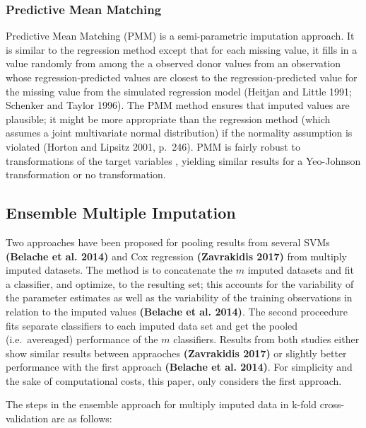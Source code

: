 \documentclass[12pt,]{article}
\begin{document}
\subsubsection{Predictive Mean Matching}\label{predictive-mean-matching}

Predictive Mean Matching (PMM) is a semi-parametric imputation approach.
It is similar to the regression method except that for each missing
value, it fills in a value randomly from among the a observed donor
values from an observation whose regression-predicted values are closest
to the regression-predicted value for the missing value from the
simulated regression model (Heitjan and Little 1991; Schenker and Taylor
1996). The PMM method ensures that imputed values are plausible; it
might be more appropriate than the regression method (which assumes a
joint multivariate normal distribution) if the normality assumption is
violated (Horton and Lipsitz 2001, p.~246). PMM is fairly robust to
transformations of the target variables
\citep{van_buuren_flexible_2012}, yielding similar results for a
Yeo-Johnson transformation or no transformation.

\subsection{Ensemble Multiple
Imputation}\label{ensemble-multiple-imputation}

Two approaches have been proposed for pooling results from several SVMs
\textbf{(Belache et al. 2014)} and Cox regression \textbf{(Zavrakidis
2017)} from multiply imputed datasets. The method is to concatenate the
\(m\) imputed datasets and fit a classifier, and optimize, to the
resulting set; this accounts for the variability of the parameter
estimates as well as the variability of the training observations in
relation to the imputed values \textbf{(Belache et al. 2014)}. The
second proceedure fits separate classifiers to each imputed data set and
get the pooled (i.e.~avereaged) performance of the \(m\) classifiers.
Results from both studies either show similar results between appraoches
\textbf{(Zavrakidis 2017)} or slightly better performance with the first
approach \textbf{(Belache et al. 2014)}. For simplicity and the sake of
computational costs, this paper, only considers the first approach.

The steps in the ensemble approach for multiply imputed data in k-fold
cross-validation are as follows:
\end{document}
